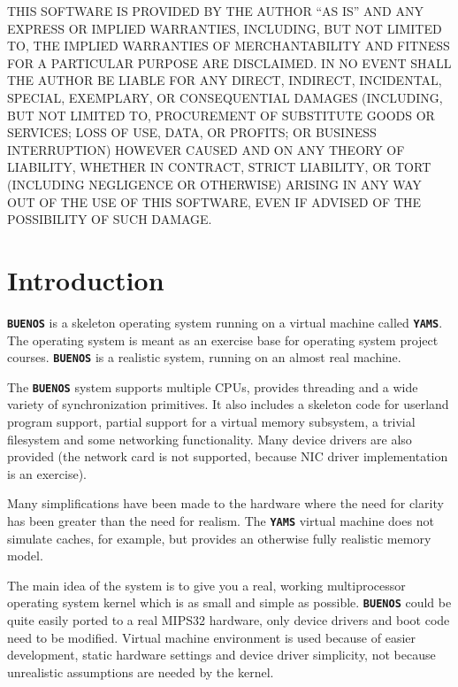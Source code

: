 \documentclass[twoside,a4paper]{report}
\newlength{\tablewidth}
\newcommand{\buenos}{\texttt{\textbf{BUENOS}}}
\newcommand{\yams}{\texttt{\textbf{YAMS}}}
\begin{document}
\begin{titlepage}
THIS SOFTWARE IS PROVIDED BY THE AUTHOR ``AS IS'' AND ANY EXPRESS
OR IMPLIED WARRANTIES, INCLUDING, BUT NOT LIMITED TO, THE IMPLIED
WARRANTIES OF MERCHANTABILITY AND FITNESS FOR A PARTICULAR PURPOSE
ARE DISCLAIMED. IN NO EVENT SHALL THE AUTHOR BE LIABLE FOR ANY
DIRECT, INDIRECT, INCIDENTAL, SPECIAL, EXEMPLARY, OR CONSEQUENTIAL
DAMAGES (INCLUDING, BUT NOT LIMITED TO, PROCUREMENT OF SUBSTITUTE
GOODS OR SERVICES; LOSS OF USE, DATA, OR PROFITS; OR BUSINESS
INTERRUPTION) HOWEVER CAUSED AND ON ANY THEORY OF LIABILITY,
WHETHER IN CONTRACT, STRICT LIABILITY, OR TORT (INCLUDING
NEGLIGENCE OR OTHERWISE) ARISING IN ANY WAY OUT OF THE USE OF THIS
SOFTWARE, EVEN IF ADVISED OF THE POSSIBILITY OF SUCH DAMAGE.

\end{titlepage}


\tableofcontents

\cleardoublepage
\pagestyle{normal}
\setlength{\tablewidth}{\linewidth-1cm}

\chapter{Introduction}

\buenos{} is a skeleton operating system running on a virtual machine
called \yams{}. The operating system is meant as an exercise base for
operating system project courses. \buenos{} is a realistic system,
running on an almost real machine.

The \buenos{} system supports multiple CPUs, provides threading and a
wide variety of synchronization primitives. It also includes a skeleton
code for userland program support, partial support for a virtual memory
subsystem, a trivial filesystem and some networking functionality.
Many device drivers are also provided (the network card is not supported,
because NIC driver implementation is an exercise).

Many simplifications have been made to the hardware where the need for
clarity has been greater than the need for realism. The \yams{} virtual
machine does not simulate caches, for example, but provides an
otherwise fully realistic memory model.

The main idea of the system is to give you a real, working
multiprocessor operating system kernel which is as small and simple as
possible. \buenos{} could be quite easily ported to a real MIPS32
hardware, only device drivers and boot code need to be modified.
Virtual machine environment is used because of easier development,
static hardware settings and device driver simplicity, not because
unrealistic assumptions are needed by the kernel.
\end{document}
